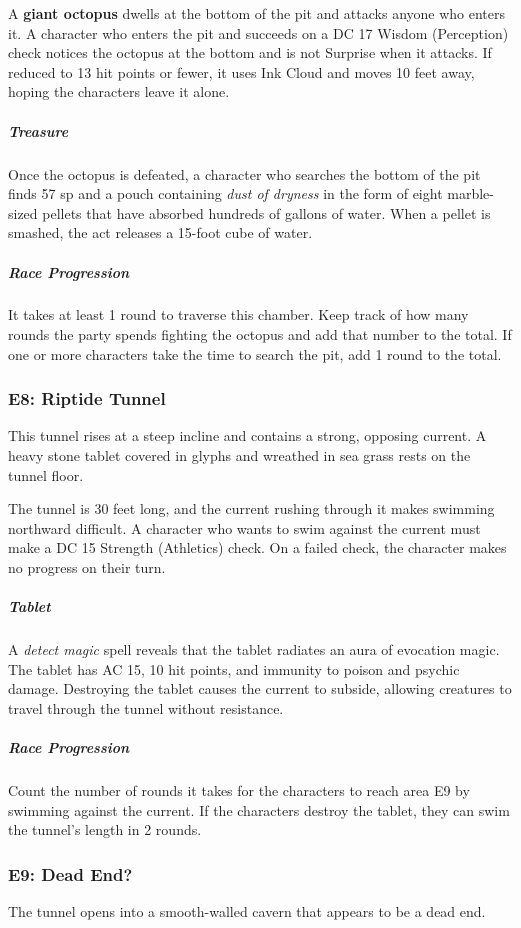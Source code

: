 \documentclass[10pt,a4paper,twoside,fancy,bg=print,twocolumn,openany,nodeprecatedcode]{dndbook}
\begin{document}
A \textbf{giant octopus} dwells at the bottom of the pit and attacks anyone who enters it. A character who enters the pit and succeeds on a DC 17 Wisdom (Perception) check notices the octopus at the bottom and is not Surprise when it attacks. If reduced to 13 hit points or fewer, it uses Ink Cloud and moves 10 feet away, hoping the characters leave it alone.

\subparagraph{Treasure}
Once the octopus is defeated, a character who searches the bottom of the pit finds 57 sp and a pouch containing \textit{dust of dryness} in the form of eight marble-sized pellets that have absorbed hundreds of gallons of water. When a pellet is smashed, the act releases a 15-foot cube of water.

\subparagraph{Race Progression}
It takes at least 1 round to traverse this chamber. Keep track of how many rounds the party spends fighting the octopus and add that number to the total. If one or more characters take the time to search the pit, add 1 round to the total.

\subsubsection{E8: Riptide Tunnel}
\begin{DndReadAloud}{}
This tunnel rises at a steep incline and contains a strong, opposing current. A heavy stone tablet covered in glyphs and wreathed in sea grass rests on the tunnel floor.

\end{DndReadAloud}

The tunnel is 30 feet long, and the current rushing through it makes swimming northward difficult. A character who wants to swim against the current must make a DC 15 Strength (Athletics) check. On a failed check, the character makes no progress on their turn.

\subparagraph{Tablet}
A \textit{detect magic} spell reveals that the tablet radiates an aura of evocation magic. The tablet has AC 15, 10 hit points, and immunity to poison and psychic damage. Destroying the tablet causes the current to subside, allowing creatures to travel through the tunnel without resistance.

\subparagraph{Race Progression}
Count the number of rounds it takes for the characters to reach area E9 by swimming against the current. If the characters destroy the tablet, they can swim the tunnel's length in 2 rounds.

\subsubsection{E9: Dead End?}
\begin{DndReadAloud}{}
The tunnel opens into a smooth-walled cavern that appears to be a dead end.

\end{DndReadAloud}
\end{document}
